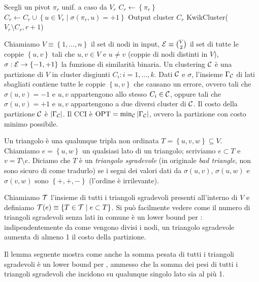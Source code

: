 \begin{algorithm}
    \caption{KwikCluster($V_r, r$)}
    Scegli un pivot $\pi_r$ unif. a caso da $V_r$\;
    $C_r \leftarrow \left\{\pi_r\right\}$ 
    $C_r \leftarrow C_r \cup \left\{u \in V_r \mid \sigma (\pi_r, u) = +1 \right\}$ 
    Output cluster $C_r$\;
    KwikCluster($V_r\setminus C_r, r+1$)\;
\end{algorithm}

Chiamiamo $V \equiv \left\{1, \dots, n\right\}$ il set di nodi in input, $\mathcal{E} \equiv \binom{V}{2}$ il set di tutte le coppie $\left\{u,v\right\}$ tali che $u, v \in V$ e $u \neq v$ (coppie di nodi distinti in $V$), $\sigma: \mathcal{E} \rightarrow \left\{-1, +1\right\}$ la funzione di similarità binaria. Un clustering $\mathcal{C}$ è una partizione di $V$ in cluster disgiunti $C_i: i = 1, \dots, k$. Dati $\mathcal{C}$ e $\sigma$, l'insieme $\Gamma_{\mathcal{C}}$ di lati sbagliati contiene tutte le coppie $\left\{u,v\right\}$ che causano un errore, ovvero tali che $\sigma (u,v) = -1$ e $u,v$ appartengono allo stesso $C_i \in \mathcal{C}$, oppure tali che $\sigma(u,v) = +1$ e $u,v$ appartengono a due diversi cluster di $\mathcal{C}$. Il costo della partizione $\mathcal{C}$ è $|\Gamma_{\mathcal{C}}|$. Il CCI è $\textnormal{OPT} = \min_{\mathcal{C}} |\Gamma_{\mathcal{C}}|$, ovvero la partizione con costo minimo possibile.

Un triangolo è una qualunque tripla non ordinata $T = \left\{u, v, w\right\} \subseteq V$. Chiamiamo $e = \left\{u, w\right\}$ un qualsiasi lato di un triangolo; scriviamo $e \subset T$ e $v = T \setminus e$. Diciamo che $T$ è un \textit{triangolo sgradevole} (in originale \textit{bad triangle}, non sono sicuro di come tradurlo) se i segni dei valori dati da $\sigma(u,v)$, $\sigma(u,w)$ e $\sigma(v,w)$ sono $\left\{+,+,-\right\}$ (l'ordine è irrilevante).

Chiamiamo $\mathcal{T}$ l'insieme di tutti i triangoli sgradevoli presenti all'interno di $V$ e definiamo $\mathcal{T}(e) \equiv \left\{T \in \mathcal{T} \mid e \subset T \right\}$. Si può facilmente vedere come il numero di triangoli sgradevoli senza lati in comune è un lower bound per \Opt: indipendentemente da come vengono divisi i nodi, un triangolo sgradevole aumenta di almeno 1 il costo della partizione.

Il lemma seguente mostra come anche la somma pesata di tutti i triangoli sgradevoli è un lower bound per \Opt, ammesso che la somma dei pesi di tutti i triangoli sgradevoli che incidono su qualunque singolo lato sia al più 1. \\

